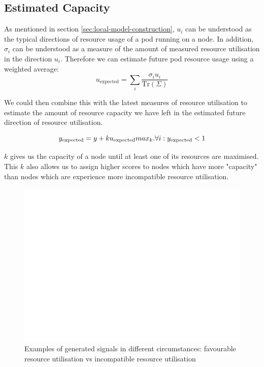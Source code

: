 \subsection{Estimated Capacity}
As mentioned in section \ref{sec:local-model-construction}, $u_i$ can be
understood as the typical directions of resource usage of a pod running on a
node. In addition, $\sigma_i$ can be understood as a measure of the amount of
measured resource utilisation in the direction $u_i$. Therefore we can
estimate future pod resource usage using a weighted average:
\[ u_\text{expected} = \sum_i \frac{\sigma_i u_i}{\text{Tr}(\Sigma)} \]

We could then combine this with the latest measures of resource utilisation to
estimate the amount of resource capacity we have left in the estimated future
direction of resource utilisation.

\[ y_{\text{expected}} = y + k u_{\text{expected}} \\
    max_k. \forall i: y_{\text{expected}} < 1 \]

$k$ gives us the capacity of a node until at least one of its resources are
maximised. This $k$ also allows us to assign higher scores to nodes which have
more "capacity" than nodes which are experience more incompatible resource
utilisation.

\begin{figure}[h]
    \centering
    \includegraphics[width=\textwidth]{images/blank.pdf}
    \caption{Examples of generated signals in different circumstances:
    favourable resource utilisation vs incompatible resource utilisation}
    \label{eval-signal}
\end{figure}

